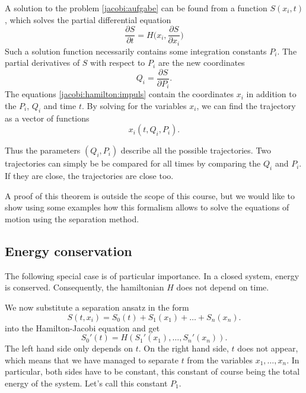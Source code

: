\begin{satz}
\label{jacobi:satz}
A solution to the problem \eqref{jacobi:aufgabe} can be found from 
a function $S(x_i, t)$, which solves the partial differential equation
\begin{equation}
\frac{\partial S}{\partial t}
=
H\biggl(
x_i,
\frac{\partial S}{\partial x_i}
\biggr)
\label{jacobi:hamilton:dgl}
\end{equation}
Such a solution function necessarily contains some integration constants
$P_i$.
The partial derivatives of $S$ with respect to $P_i$ are the new coordinates
\begin{equation}
Q_i=\frac{\partial S}{\partial P_i}.
\label{jacobi:hamilton:impuls}
\end{equation}
The equations \eqref{jacobi:hamilton:impuls} contain the coordinates 
$x_i$ in addition to the $P_i$, $Q_i$ and time $t$.
By solving for the variables $x_i$, we can find the trajectory as 
a vector of functions
\[
x_i(t,Q_i,P_i).
\]
\end{satz}
Thus the parameters $(Q_i,P_i)$
describe all the possible trajectories.
Two trajectories can simply be be compared for all times by comparing the
$Q_i$ and $P_i$.
If they are close, the trajectories are close too.

A proof of this theorem is outside the scope of this course, but we
would like to show using some examples how this formalism allows to
solve the equations of motion using the separation method.

\subsection{Energy conservation}
The following special case is of particular importance.
In a closed system, energy is conserved.
Consequently, the hamiltonian $H$ does not depend on time.

We now substitute a separation ansatz in the form
\[
S(t,x_i)=S_0(t)+S_1(x_1)+\dots+S_n(x_n).
\]
into the Hamilton-Jacobi equation and get
\[
S_0'(t)=H(S_1'(x_1),\dots, S_n'(x_n)).
\]
The left hand side only depends on $t$.
On the right hand side, $t$ does not appear, which means that we have
managed to separate $t$ from the variables $x_1,\dots,x_n$.
In particular, both sides have to be constant, this constant
of course being the total energy of the system.
Let's call this constant $P_1$.

